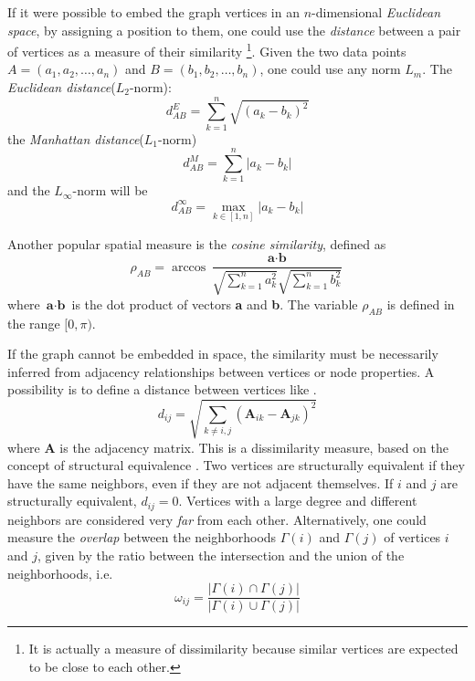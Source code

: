 {If it were possible to embed the graph vertices in an $n$-dimensional \textit{Euclidean space}, by assigning a position to them, one could use the \textit{distance} between a pair of vertices as a measure of their similarity \footnote{It is actually a measure of dissimilarity because similar vertices are expected to be close to each other.}. Given the two data points $A = (a_1, a_2, \dots, a_n)$ and $B = (b_1, b_2, \dots , b_n)$, one could use any norm $L_m$.\newline \newline
The \textit{Euclidean distance}($L_2$-norm):
\begin{equation}
d_{AB}^E = \sum_{k=1}^{n} \sqrt{(a_k - b_k)^2}
\end{equation}
the \textit{Manhattan distance}($L_1$-norm)
\begin{equation}
d_{AB}^M = \sum_{k=1}^{n} \vert a_k - b_k \vert
\end{equation}
and the $L_\infty$-norm will be
\begin{equation}
d_{AB}^\infty = \underset{k \in [1,n]}{\max} \vert a_k - b_k \vert
\end{equation}

Another popular spatial measure is the \textit{cosine similarity}, defined as
\begin{equation}\label{eq:cosine_similarity}
\rho_{AB} = \arccos \dfrac{\textbf{a} \cdot \textbf{b}}{\sqrt{\sum\limits_{k=1}^{n}{a_k^2}} \sqrt{\sum\limits_{k=1}^{n}{b_k^2}}}
\end{equation}
where $\textbf{a}\cdot\textbf{b}$ is the dot product of vectors \textbf{a} and \textbf{b}. The variable $\rho_{AB}$ is defined in the range $[0,\pi)$.

If the graph cannot be embedded in space, the similarity must be necessarily inferred from adjacency relationships between vertices or node properties. A possibility is to define a distance between vertices like \cite{ref-8, ref-9}.
\begin{equation}
d_{ij} = \sqrt{\sum_{k \neq {i,j}} (\textbf{A}_{ik} - \textbf{A}_{jk})^2}
\end{equation}
where \textbf{A} is the adjacency matrix. This is a dissimilarity measure, based on the concept of structural equivalence \cite{ref-10}. Two vertices are structurally equivalent if they have the same neighbors, even if they are not adjacent themselves. If $i$ and $j$ are structurally equivalent, $d_{ij} = 0$. Vertices with a large degree and different neighbors are considered very \textit{far} from each other. Alternatively, one could measure the \textit{overlap} between the neighborhoods $\varGamma(i)$ and $\varGamma(j)$ of vertices $i$ and $j$, given by the ratio between the intersection and the union of the neighborhoods, i.e.
\begin{equation}\label{eq:neihborhood-overlap}
\omega_{ij} = \dfrac{\vert \varGamma(i) \cap \varGamma(j) \vert}{\vert \varGamma(i) \cup \varGamma(j) \vert}
\end{equation}

}
